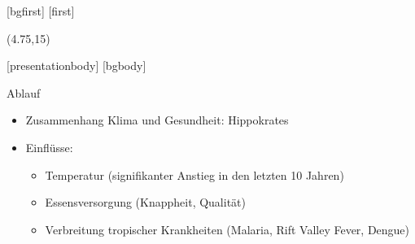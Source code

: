 [bgfirst]
[first]
\subtitle{\theslidesection: Next Generation Sequencing}
\begin{frame}[noframenumbering]
    \titlepage
    \begin{textblock}{10}(4.75,15)
        \cite{ProgrammingLogo}
    \end{textblock}
\end{frame}
[presentationbody] 
[bgbody]

\begin{frame}{Ablauf}
	\begin{itemize}
		\item Zusammenhang Klima und Gesundheit: Hippokrates
		\item Einflüsse:
		\begin{itemize}
			\item Temperatur (signifikanter Anstieg in den letzten 10 Jahren)
			\item Essensversorgung (Knappheit, Qualität)
			\item Verbreitung tropischer Krankheiten (Malaria, Rift Valley Fever, Dengue)
		\end{itemize}
	\end{itemize}
\end{frame}

